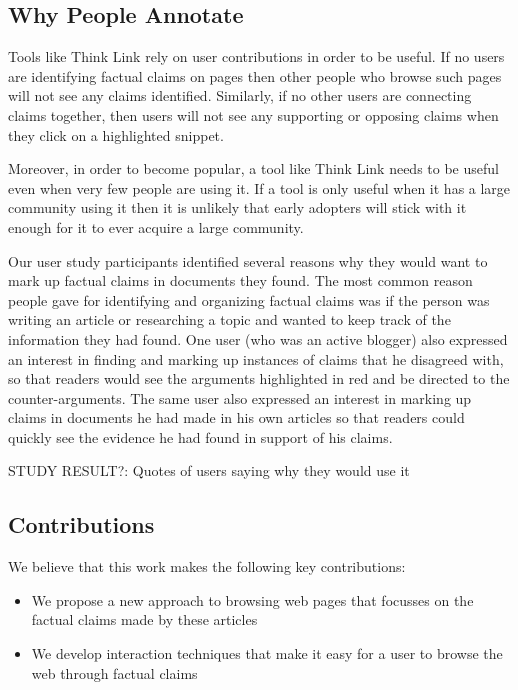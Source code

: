 \documentclass{chi2009}
\newcommand{\studyresult}[1]{{\color{red} STUDY RESULT?: #1}\\}
\begin{document}
\subsection{Why People Annotate}

Tools like Think Link rely on user contributions in order to be useful. If no users are identifying factual claims on pages then other people who browse such pages will not see any claims identified. Similarly, if no other users are connecting claims together, then users will not see any supporting or opposing claims when they click on a highlighted snippet.

Moreover, in order to become popular, a tool like Think Link needs to be useful even when very few people are using it. If a tool is only useful when it has a large community using it then it is unlikely that early adopters will stick with it enough for it to ever acquire a large community.

Our user study participants identified several reasons why they would want to mark up factual claims in documents they found. The most common reason people gave for identifying and organizing factual claims was if the person was writing an article or researching a topic and wanted to keep track of the information they had found. One user (who was an active blogger) also expressed an interest in finding and marking up instances of claims that he disagreed with, so that readers would see the arguments highlighted in red and be directed to the counter-arguments. The same user also expressed an interest in marking up claims in documents he had made in his own articles so that readers could quickly see the evidence he had found in support of his claims.

\studyresult{Quotes of users saying why they would use it}

\subsection{Contributions}

We believe that this work makes the following key contributions:

\begin{itemize}
\item We propose a new approach to browsing web pages that focusses on the factual claims made by these articles
\item We develop interaction techniques that make it easy for a user to browse the web through factual claims
\end{itemize}
\end{document}
